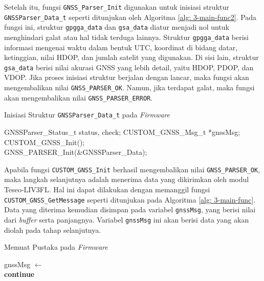 Setelah itu, fungsi \texttt{GNSS\_Parser\_Init} digunakan untuk inisiasi struktur \texttt{GNSSParser\_Data\_t} seperti ditunjukan oleh Algoritma \ref{alg: 3-main-func2}. Pada fungsi ini, struktur \texttt{gpgga\_data} dan \texttt{gsa\_data} diatur menjadi nol untuk menghindari galat atau hal tidak terduga lainnya. Struktur \texttt{gpgga\_data} berisi informasi mengenai waktu dalam bentuk UTC, koordinat di bidang datar, ketinggian, nilai HDOP, dan jumlah satelit yang digunakan. Di sisi lain, struktur \texttt{gsa\_data} berisi nilai akurasi GNSS yang lebih detail, yaitu HDOP, PDOP, dan VDOP. Jika proses inisiasi struktur berjalan dengan lancar, maka fungsi akan mengembalikan nilai \texttt{GNSS\_PARSER\_OK}. Namun, jika terdapat galat, maka fungsi akan mengembalikan nilai \texttt{GNSS\_PARSER\_ERROR}.

\begin{algorithm}
	\caption{Inisiasi Struktur \texttt{GNSSParser\_Data\_t} pada \textit{Firmware}}\label{alg: 3-main-func2}
	\begin{algorithmic}[1]
		\State GNSSParser\_Status\_t status, check;
		\State CUSTOM\_GNSS\_Msg\_t *gnssMsg;
		\\
		\State CUSTOM\_GNSS\_Init();
		\\
		\State GNSS\_PARSER\_Init(\&GNSSParser\_Data);
	\end{algorithmic}
\end{algorithm}

Apabila fungsi \texttt{CUSTOM\_GNSS\_Init} berhasil mengembalikan nilai \texttt{GNSS\_PARSER\_OK}, maka langkah selanjutnya adalah menerima data yang dikirimkan oleh modul Teseo\hyp{}LIV3FL. Hal ini dapat dilakukan dengan memanggil fungsi \texttt{CUSTOM\_GNSS\_GetMessage} seperti ditunjukan pada Algoritma \ref{alg: 3-main-func}. Data yang diterima kemudian disimpan pada variabel \texttt{gnssMsg}, yang berisi nilai dari \textit{buffer} serta panjangnya. Variabel \texttt{gnssMsg} ini akan berisi data yang akan diolah pada tahap selanjutnya.

\begin{algorithm}
	\caption{Memuat Pustaka pada \textit{Firmware}}
	\label{alg: 3-main-func}
	\begin{algorithmic}[1]
		\State gnssMsg $\gets$ 
		\\
			\State \textbf{continue}
		\EndIf
	\EndWhile	
	\end{algorithmic}
\end{algorithm}

